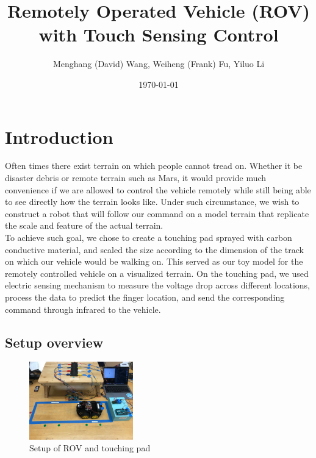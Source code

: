 \documentclass[reprint,amsmath, amsfonts, amssymb, aps, letterpaper]{revtex4-1}
\begin{document}
\title{Remotely Operated Vehicle (ROV) with Touch Sensing Control}
\author{Menghang (David) Wang, Weiheng (Frank) Fu, Yiluo Li}

\date{\today}



\begin{abstract}

\end{abstract}

\maketitle

\section{Introduction}
Often times there exist terrain on which people cannot tread on. Whether it be disaster debris or remote terrain such as Mars, it would provide much convenience if we are allowed to control the vehicle remotely while still being able to see directly how the terrain looks like. Under such circumstance, we wish to construct a robot that will follow our command on a model terrain that replicate the scale and feature of the actual terrain.
\\\indent To achieve such goal, we chose to create a touching pad sprayed with carbon conductive material, and scaled the size according to the dimension of the track on which our vehicle would be walking on. This served as our toy model for the remotely controlled vehicle on a visualized terrain. On the touching pad, we used electric sensing mechanism to measure the voltage drop across different locations, process the data to predict the finger location, and send the corresponding command through infrared to the vehicle.

\subsection{Setup overview}
\begin{figure}[h]
\centering
    \includegraphics[width=0.4\textwidth]{./figure/setup}     
       \caption{Setup of ROV and touching pad }
    \label{fig::setup}
\end{figure}
\end{document}
